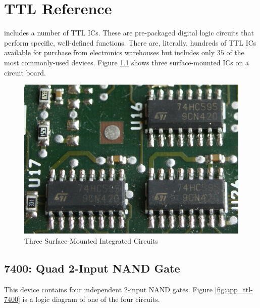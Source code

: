 
\chapter{TTL Reference}\label{app_ttl}

\LE includes a number of \ac{TTL} \acp{IC}. These are pre-packaged digital logic circuits that perform specific, well-defined functions. There are, literally, hundreds of \ac{TTL} \acp{IC} available for purchase from electronics warehouses but \LE includes only $ 35 $ of the most commonly-used devices. Figure \ref{fig:app_ttl-74HC595} shows three surface-mounted \acp{IC} on a circuit board.

\begin{figure}[H]
	\centering
	\includegraphics[width=\maxwidth{.75\linewidth}]{gfx/app_ttl-74HC595}
	\caption{Three Surface-Mounted Integrated Circuits}
	\label{fig:app_ttl-74HC595}
\end{figure}

\section{7400: Quad 2-Input NAND Gate}

This device contains four independent 2-input NAND gates. Figure \ref{fig:app_ttl-7400} is a logic diagram of one of the four circuits.


